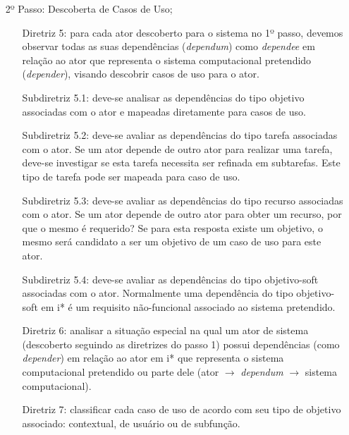 \begin{enumerate}
                \item[2º Passo:] Descoberta de Casos de Uso;
                \begin{enumerate}
                    \item[Diretriz 5:] para cada ator descoberto para o sistema no 1º passo, devemos observar todas as suas dependências (\emph{dependum}) como \emph{dependee} em relação ao ator que representa o sistema computacional pretendido (\emph{depender}), visando descobrir casos de uso para o ator.
                    \item[Subdiretriz 5.1:] deve-se analisar as dependências do tipo objetivo associadas com o ator e mapeadas diretamente para casos de uso.
                    \item[Subdiretriz 5.2:] deve-se avaliar as dependências do tipo tarefa associadas com o ator. Se um ator depende de outro ator para realizar uma tarefa, deve-se investigar se esta tarefa necessita ser refinada em subtarefas. Este tipo de tarefa pode ser mapeada para caso de uso.
                    \item[Subdiretriz 5.3:] deve-se avaliar as dependências do tipo recurso associadas com o ator. Se um ator depende de outro ator para obter um recurso, por que o mesmo é requerido? Se para esta resposta existe um objetivo, o mesmo será candidato a ser um objetivo de um caso de uso para este ator.
                    \item[Subdiretriz 5.4:] deve-se avaliar as dependências do tipo objetivo-soft associadas com o ator. Normalmente uma dependência do tipo objetivo-soft em i* é um requisito não-funcional associado ao sistema pretendido.
                    \item[Diretriz 6:] analisar a situação especial na qual um ator de sistema (descoberto seguindo as diretrizes do passo 1) possui dependências (como \emph{depender}) em relação ao ator em i* que representa o sistema computacional pretendido ou parte dele (ator $\rightarrow$ \emph{dependum} $\rightarrow$ sistema computacional).
                    \item[Diretriz 7:]  classificar cada caso de uso de acordo com seu tipo de objetivo associado: contextual, de usuário ou de subfunção.
                \end{enumerate}


\end{enumerate}
